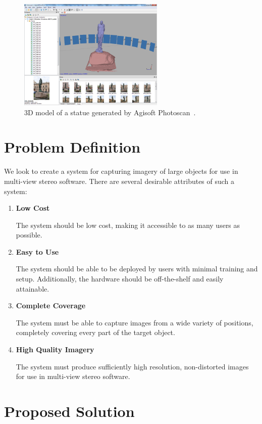 \begin{figure}
\centering
\includegraphics[height=200px]{../images/photoscan.png}
\caption{3D model of a statue generated by Agisoft Photoscan~\cite{Agisoft}.}
\end{figure}


\section{Problem Definition}
We look to create a system for capturing imagery of large objects for use in multi-view stereo software. There are several desirable attributes of such a system:

\begin{enumerate}
\item
\textbf{Low Cost}

The system should be low cost, making it accessible to as many users as possible.

\item
\textbf{Easy to Use}

The system should be able to be deployed by users with minimal training and setup. Additionally, the hardware should be off-the-shelf and easily attainable.

\item
\textbf{Complete Coverage}

The system must be able to capture images from a wide variety of positions, completely covering every part of the target object.

\item
\textbf{High Quality Imagery}

The system must produce sufficiently high resolution, non-distorted images for use in multi-view stereo software.

\end{enumerate}

\section{Proposed Solution}

